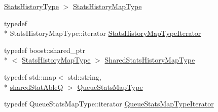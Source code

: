 \begin{DoxyCompactItemize}
\hyperlink{namespacekisscpp_a4629097b5a6697a8a1eefd9ac5b0a2b6}{Stats\-History\-Type} $>$ \hyperlink{namespacekisscpp_a8dbb864ea5d1e1fae0d3a1435bd295e7}{Stats\-History\-Map\-Type}
\item 
typedef \\*
Stats\-History\-Map\-Type\-::iterator \hyperlink{namespacekisscpp_ae45d7146f3abe3c95364c6ea280f7487}{Stats\-History\-Map\-Type\-Iterator}
\item 
typedef boost\-::shared\-\_\-ptr\\*
$<$ \hyperlink{namespacekisscpp_a8dbb864ea5d1e1fae0d3a1435bd295e7}{Stats\-History\-Map\-Type} $>$ \hyperlink{namespacekisscpp_afa626c76d3dca5d5e1be4146f211fefa}{Shared\-Stats\-History\-Map\-Type}
\item 
typedef std\-::map$<$ std\-::string, \\*
\hyperlink{namespacekisscpp_a141592ccd82280d2692ca3b9b490faab}{shared\-Stat\-Able\-Q} $>$ \hyperlink{namespacekisscpp_a36c7aee4be6fad3cc8ab5ec896e1f9a5}{Queue\-Stats\-Map\-Type}
\item 
typedef Queue\-Stats\-Map\-Type\-::iterator \hyperlink{namespacekisscpp_a108455a00c9a8ea1f3416c5cab767bbe}{Queue\-Stats\-Map\-Type\-Iterator}
\end{DoxyCompactItemize}
